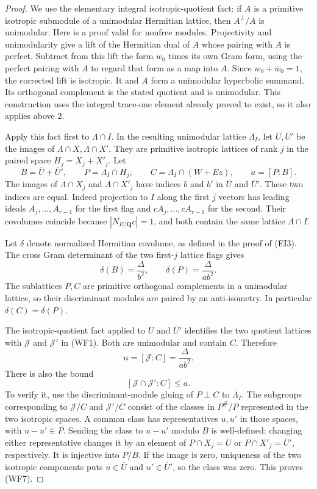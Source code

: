 \begin{proof}
We use the elementary integral isotropic-quotient fact:
if $A$ is a primitive isotropic submodule of a unimodular
Hermitian lattice, then $A^\perp/A$ is unimodular.
Here is a proof valid for nonfree modules.  Projectivity
and unimodularity give a lift of the Hermitian dual of
$A$ whose pairing with $A$ is perfect.  Subtract from
this lift the form $w_0$ times its own Gram form, using
the perfect pairing with $A$ to regard that form as a
map into $A$.  Since $w_0+\bar w_0=1$, the corrected
lift is isotropic.  It and $A$ form a unimodular
hyperbolic summand.  Its orthogonal complement is the
stated quotient and is unimodular.  This construction
uses the integral trace-one element already proved to
exist, so it also applies above $2$.

Apply this fact first to $\Lambda\cap I$.  In the
resulting unimodular lattice $\Lambda_I$, let
$\overline U,\overline U'$ be the images of
$\Lambda\cap X,\Lambda\cap X'$.  They are primitive
isotropic lattices of rank $j$ in the paired space
$H_j=X_j+X'_j$.  Let
\[
 B=\overline U+\overline U',\qquad
 P=\Lambda_I\cap H_j,\qquad
 C=\Lambda_I\cap(W+Ez),\qquad a=[P:B].
\]
The images of $\Lambda\cap X_j$ and
$\Lambda\cap X'_j$ have indices $b$ and $b'$ in
$\overline U$ and $\overline U'$.  These two indices
are equal.  Indeed projection to $I$ along the first
$j$ vectors has leading ideals $A_j,\ldots,A_{r-1}$
for the first flag and $cA_j,\ldots,cA_{r-1}$ for
the second.  Their covolumes coincide because
$|N_{E/\mathbf Q}c|=1$, and both contain the same
lattice $\Lambda\cap I$.

Let $\delta$ denote normalized Hermitian covolume, as
defined in the proof of (EI3).  The cross Gram determinant
of the two first-$j$ lattice flags gives
\[
        \delta(B)=\frac{\Delta}{b^2},\qquad
        \delta(P)=\frac{\Delta}{ab^2}.
 \tag{WF5}
\]
The sublattices $P,C$ are primitive orthogonal complements
in a unimodular lattice, so their discriminant modules
are paired by an anti-isometry.  In particular
$\delta(C)=\delta(P)$.

The isotropic-quotient fact applied to $\overline U$
and $\overline U'$ identifies the two quotient lattices
with $\mathcal J$ and $\mathcal J'$ in (WF1).  Both
are unimodular and contain $C$.  Therefore
\[
                         n=[\mathcal J:C]
                                =\frac{\Delta}{ab^2}.
 \tag{WF6}
\]
There is also the bound
\[
                         [\mathcal J\cap\mathcal J':C]\leq a.
 \tag{WF7}
\]
To verify it, use the discriminant-module gluing of
$P\perp C$ to $\Lambda_I$.  The subgroups corresponding
to $\mathcal J/C$ and $\mathcal J'/C$ consist of the
classes in $P^\#/P$ represented in the two isotropic
spaces.  A common class has representatives $u,u'$ in
those spaces, with $u-u'\in P$.  Sending the class to
$u-u'$ modulo $B$ is well-defined: changing either
representative changes it by an element of
$P\cap X_j=\overline U$ or
$P\cap X'_j=\overline U'$, respectively.
It is injective into $P/B$.  If the image
is zero, uniqueness of the two isotropic components
puts $u\in\overline U$ and $u'\in\overline U'$, so
the class was zero.  This proves (WF7).


\end{proof}
